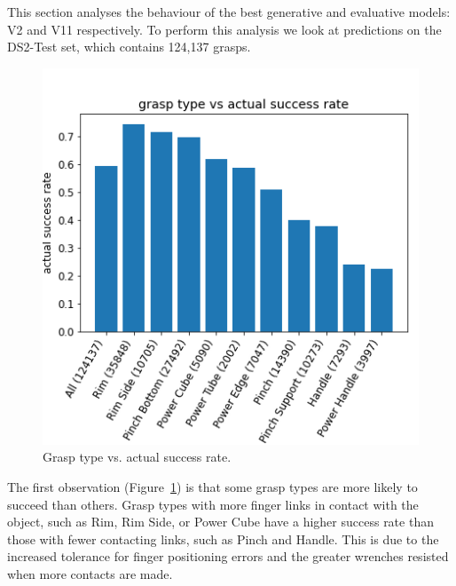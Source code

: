 
\noindent
This section analyses the behaviour of the best generative and evaluative models: V2 and V11 respectively. To perform this analysis we look at predictions on the DS2-Test set, which contains 124,137 grasps. %
\begin{figure}[h]
\centering 
\includegraphics[width=0.5\columnwidth]{images/post-analysis/Grasp_type_vs_success_prob.png}
\caption{Grasp type vs. actual success rate.}
\label{fig:post2}
\end{figure}

The first observation (Figure~\ref{fig:post2}) is that some grasp types are more likely to succeed than others. Grasp types with more finger links in contact with the object, such as Rim, Rim Side, or Power Cube have a higher success rate than those with fewer contacting links, such as Pinch and Handle.  This is due to the increased tolerance for finger positioning errors and the greater wrenches resisted when more contacts are made. 

